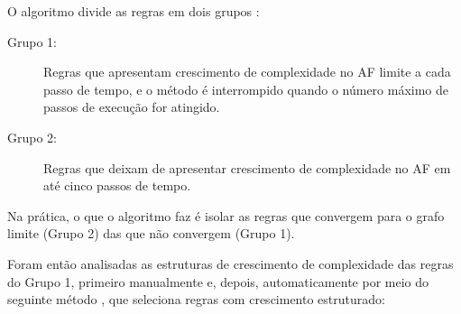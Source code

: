 \documentclass[12pt,a4paper]{article}
\begin{document}
O algoritmo divide as regras em dois grupos :

\begin{description}
\item[Grupo 1:] Regras que apresentam crescimento de complexidade no AF
limite a cada passo de tempo, e o método é interrompido quando o
número máximo de passos de execução for atingido.
\item[Grupo 2:] Regras que deixam de apresentar crescimento de complexidade no
AF em até cinco passos de tempo.
\end{description}

Na prática, o que o algoritmo faz é isolar as regras que convergem para o
grafo limite (Grupo 2) das que não convergem (Grupo 1). 

Foram então analisadas as estruturas de crescimento de complexidade das regras
do Grupo 1, primeiro manualmente e, depois, automaticamente por meio do
seguinte método , que seleciona regras com crescimento
estruturado:
\end{document}
